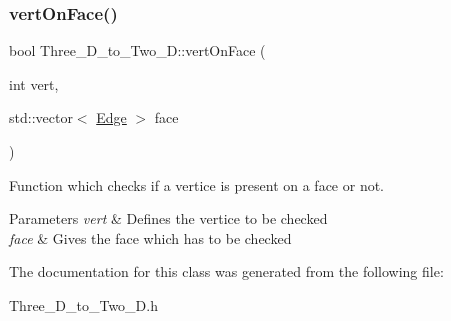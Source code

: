 \subsubsection{\texorpdfstring{vert\+On\+Face()}{vertOnFace()}}
{\footnotesize\ttfamily bool Three\+\_\+\+D\+\_\+to\+\_\+\+Two\+\_\+\+D\+::vert\+On\+Face (\begin{DoxyParamCaption}\item[{int}]{vert,  }\item[{std\+::vector$<$ \mbox{\hyperlink{struct_edge}{Edge}} $>$}]{face }\end{DoxyParamCaption})}



Function which checks if a vertice is present on a face or not. 


\begin{DoxyParams}{Parameters}
{\em vert} & Defines the vertice to be checked \\
\hline
{\em face} & Gives the face which has to be checked \\
\hline
\end{DoxyParams}


The documentation for this class was generated from the following file\+:\begin{DoxyCompactItemize}
\item 
Three\+\_\+\+D\+\_\+to\+\_\+\+Two\+\_\+\+D.\+h\end{DoxyCompactItemize}
